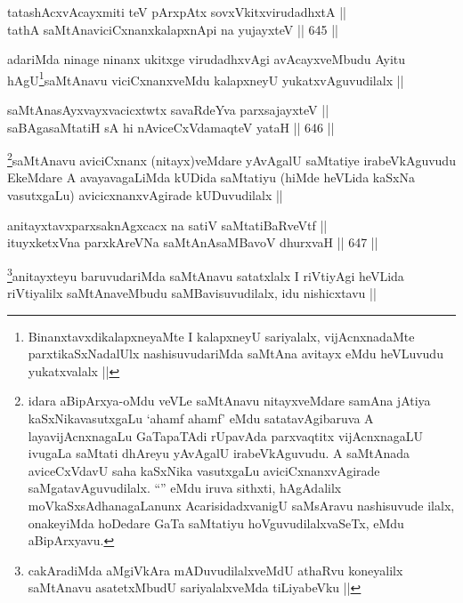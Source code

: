 \begin{shl}
tatashAcxvAcayxmiti teV pArxpAtx sovxVkitxvirudadhxtA ||  \\
tathA saMtAnaviciCxnanxkalapxnA\s pi na yujayxteV ||  645 ||  
\end{shl}

\begin{artha}
adariMda ninage ninanx ukitxge virudadhxvAgi avAcayxveMbudu Ayitu hAgU\footnote{BinanxtavxdikalapxneyaMte I kalapxneyU sariyalalx, vijAcnxnadaMte parxtikaSxNadalUlx nashisuvudariMda saMtAna avitayx eMdu heVLuvudu yukatxvalalx ||}saMtAnavu viciCxnanxveMdu kalapxneyU yukatxvAguvudilalx ||
\end{artha}


\begin{shl}
saMtAnasAyxvayxvacicxtwtx savaRdeYva parxsajayxteV || \\
saBAgasaMtatiH sA hi nAviceCxVdamaqteV yataH ||  646 ||  
\end{shl}

\begin{artha}
\footnote{idara aBipArxya-oMdu veVLe saMtAnavu nitayxveMdare samAna jAtiya kaSxNikavasutxgaLu `ahamf ahamf' eMdu satatavAgibaruva A layavijAcnxnagaLu GaTapaTAdi rUpavAda parxvaqtitx vijAcnxnagaLU ivugaLa saMtati dhAreyu yAvAgalU irabeVkAguvudu. A saMtAnada aviceCxVdavU saha kaSxNika vasutxgaLu aviciCxnanxvAgirade saMgatavAguvudilalx. ``\stext'' eMdu iruva sithxti, hAgAdalilx moVkaSxsAdhanagaLanunx AcarisidadxvanigU saMsAravu nashisuvude ilalx, onakeyiMda hoDedare GaTa saMtatiyu hoVguvudilalxvaSeTx, eMdu aBipArxyavu.}saMtAnavu aviciCxnanx (nitayx)veMdare yAvAgalU saMtatiye irabeVkAguvudu EkeMdare A avayavagaLiMda kUDida saMtatiyu (hiMde heVLida kaSxNa vasutxgaLu) avicicxnanxvAgirade kUDuvudilalx ||
\end{artha}


\begin{shl}
anitayxtavxparxsaknAgxcacx  na satiV saMtatiBaRveVtf ||  \\
ituyxketxVna parxkAreVNa saMtAnAsaMBavoV dhurxvaH ||  647 ||  
\end{shl}	

\begin{artha}
\footnote{cakAradiMda aMgiVkAra mADuvudilalxveMdU athaRvu koneyalilx saMtAnavu asatetxMbudU sariyalalxveMda tiLiyabeVku ||}anitayxteyu baruvudariMda saMtAnavu satatxlalx I riVtiyAgi heVLida riVtiyalilx saMtAnaveMbudu saMBavisuvudilalx, idu nishicxtavu ||
\end{artha}

